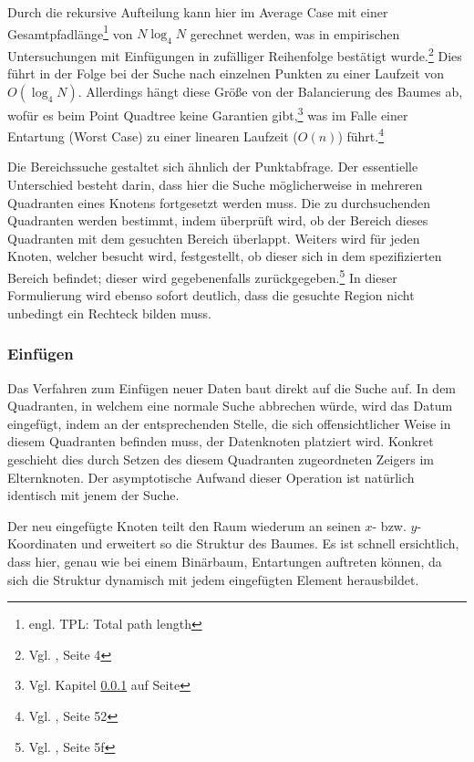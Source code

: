 \documentclass[%
			fontsize=12pt,%
			paper=a4,%
			DIV11,
			liststotoc,
			bibtotoc,
			draft=false,%
			titlepage
			]{scrartcl}
\newcommand{\zit}[3]{#1 \cite{#2}, #3}
\newcommand{\footzit}[3]{\footnote{\zit{#1}{#2}{#3}}}
\begin{document}
Durch die rekursive Aufteilung kann hier im Average Case mit einer  Gesamtpfadlänge\footnote{engl. TPL: Total path length} von $N \log_4 N$ gerechnet werden, was in empirischen Untersuchungen mit Einfügungen in zufälliger Reihenfolge bestätigt wurde.\footzit{Vgl.}{DBLP:journals/acta/FinkelB74}{Seite 4}
Dies führt in der Folge bei der Suche nach einzelnen Punkten zu einer Laufzeit von $O(\log_4 N)$.
Allerdings hängt diese Größe von der Balancierung des Baumes ab, wofür es beim Point Quadtree keine Garantien gibt,\footnote{Vgl. Kapitel \ref{sec:pointquadtree:insert} auf Seite \pageref{sec:pointquadtree:insert}}
was im Falle einer Entartung (Worst Case) zu einer linearen Laufzeit ($O(n)$) führt.\footzit{Vgl.}{Samet90}{Seite 52}

Die Bereichssuche gestaltet sich ähnlich der Punktabfrage.
Der essentielle Unterschied besteht darin, dass hier die Suche möglicherweise in mehreren Quadranten eines Knotens fortgesetzt werden muss.
Die zu durchsuchenden Quadranten werden bestimmt, indem überprüft wird, ob der Bereich dieses Quadranten mit dem gesuchten Bereich überlappt.
Weiters wird für jeden Knoten, welcher besucht wird, festgestellt, ob dieser sich in dem spezifizierten Bereich befindet; dieser wird gegebenenfalls zurückgegeben.\footzit{Vgl.}{DBLP:journals/acta/FinkelB74}{Seite 5f}
In dieser Formulierung wird ebenso sofort deutlich, dass die gesuchte Region nicht unbedingt ein Rechteck bilden muss.


\subsubsection{Einfügen}
\label{sec:pointquadtree:insert}
Das Verfahren zum Einfügen neuer Daten baut direkt auf die Suche auf.
In dem Quadranten, in welchem eine normale Suche abbrechen würde, wird das Datum eingefügt, indem an der entsprechenden Stelle, die sich offensichtlicher Weise in diesem Quadranten befinden muss, der Datenknoten platziert wird.
Konkret geschieht dies durch Setzen des diesem Quadranten zugeordneten Zeigers im Elternknoten.
Der asymptotische Aufwand dieser Operation ist natürlich identisch mit jenem der Suche.

Der neu eingefügte Knoten teilt den Raum wiederum an seinen $x$- bzw. $y$-Koordinaten und erweitert so die Struktur des Baumes.  
Es ist schnell ersichtlich, dass hier, genau wie bei einem Binärbaum, Entartungen auftreten können, da sich die Struktur dynamisch mit jedem eingefügten Element herausbildet.
\end{document}

